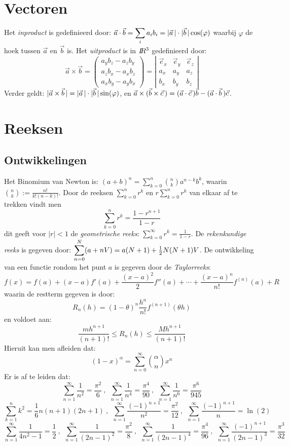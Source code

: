 \documentclass[twoside]{report}
\begin{document}
\section{Vectoren}
Het {\it inproduct} is gedefinieerd door:
$\displaystyle\vec{a}\cdot\vec{b}=\sum_i a_ib_i=|\vec{a}\,|\cdot|\vec{b}\,|\cos(\varphi)$
\npar
waarbij $\varphi$ de hoek tussen $\vec{a}$ en $\vec{b}$ is. Het
{\it uitproduct} is in $I\hspace{-1mm}R^3$ gedefinieerd door:
\[
\vec{a}\times\vec{b}=\left(\begin{array}{c}
a_yb_z-a_zb_y\\
a_zb_x-a_xb_z\\
a_xb_y-a_yb_x\end{array}\right)=
\left|\begin{array}{ccc}
\vec{e}_x&\vec{e}_y&\vec{e}_z\\
a_x&a_y&a_z\\
b_x&b_y&b_z\end{array}\right|
\]
Verder geldt: $|\vec{a}\times\vec{b}\,|=|\vec{a}\,|\cdot|\vec{b}\,|\sin(\varphi)$, en
$\vec{a}\times(\vec{b}\times\vec{c}\,)=(\vec{a}\cdot\vec{c}\,)\vec{b}-(\vec{a}\cdot\vec{b}\,)\vec{c}$.

\section{Reeksen}
\subsection{Ontwikkelingen}
Het Binomium van Newton is: $\displaystyle (a+b)^n=\sum_{k=0}^n{n\choose k}a^{n-k}b^k$,
waarin $\displaystyle{n\choose k}:=\frac{n!}{k!(n-k)!}$.
\npar
Door de reeksen $\sum\limits_{k=0}^n r^k$ en $r\sum\limits_{k=0}^n r^k$ van
elkaar af te trekken vindt men
\[
\sum_{k=0}^n r^k=\frac{1-r^{n+1}}{1-r}
\]
dit geeft voor $|r|<1$ de {\it geometrische reeks}:
$\displaystyle\sum_{k=0}^\infty r^k=\frac{1}{1-r}$.
\npar
De {\it rekenkundige reeks} is gegeven door:
$\displaystyle\sum_{n=0}^N(a+nV)=a(N+1)+\mbox{$\frac{1}{2}$} N(N+1)V$.
\npar
De ontwikkeling van een functie rondom het punt $a$ is gegeven door de
{\it Taylorreeks}:
\[
f(x)=f(a)+(x-a)f'(a)+\frac{(x-a)^2}{2}f''(a)+\cdots+\frac{(x-a)^n}{n!}f^{(n)}(a)+R
\]
waarin de restterm gegeven is door:
\[
R_n(h)=(1-\theta)^n\frac{h^n}{n!}f^{(n+1)}(\theta h)
\]
en voldoet aan:
\[
\frac{mh^{n+1}}{(n+1)!}\leq R_n(h)\leq\frac{Mh^{n+1}}{(n+1)!}
\]
Hieruit kan men afleiden dat:
\[
(1-x)^\alpha=\sum_{n=0}^\infty{\alpha\choose n}x^n
\]
Er is af te leiden dat:
\[
\sum_{n=1}^\infty\frac{1}{n^2}=\frac{\pi^2}{6}~,~~
\sum_{n=1}^\infty\frac{1}{n^4}=\frac{\pi^4}{90}~,~~
\sum_{n=1}^\infty\frac{1}{n^6}=\frac{\pi^6}{945}
\]
\[
\sum_{k=1}^nk^2=\mbox{$\frac{1}{6}$}n(n+1)(2n+1)~,~~
\sum_{n=1}^\infty\frac{(-1)^{n+1}}{n^2}=\frac{\pi^2}{12}~,~~
\sum_{n=1}^\infty\frac{(-1)^{n+1}}{n}=\ln(2)
\]
\[
\sum_{n=1}^\infty\frac{1}{4n^2-1}=\mbox{$\frac{1}{2}$}~,~~
\sum_{n=1}^\infty\frac{1}{(2n-1)^2}=\frac{\pi^2}{8}~,~~
\sum_{n=1}^\infty\frac{1}{(2n-1)^4}=\frac{\pi^4}{96}~,~~
\sum_{n=1}^\infty\frac{(-1)^{n+1}}{(2n-1)^3}=\frac{\pi^3}{32}
\]
\end{document}
